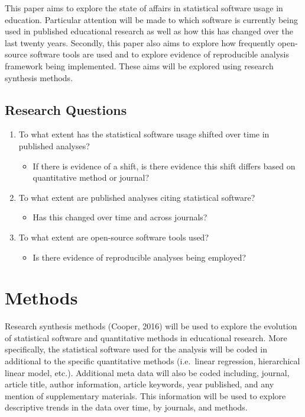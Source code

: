\documentclass[english,man]{apa6}
\providecommand{\tightlist}{%
  \setlength{\itemsep}{0pt}\setlength{\parskip}{0pt}}
\newcounter{author}
\theoremstyle{definition}
\theoremstyle{definition}
\theoremstyle{remark}
\begin{document}
This paper aims to explore the state of affairs in statistical software
usage in education. Particular attention will be made to which software
is currently being used in published educational research as well as how
this has changed over the last twenty years. Secondly, this paper also
aims to explore how frequently open-source software tools are used and
to explore evidence of reproducible analysis framework being
implemented. These aims will be explored using research synthesis
methods.

\subsection{Research Questions}\label{research-questions}

\begin{enumerate}
\def\labelenumi{\arabic{enumi}.}
\tightlist
\item
  To what extent has the statistical software usage shifted over time in
  published analyses?

  \begin{itemize}
  \tightlist
  \item
    If there is evidence of a shift, is there evidence this shift
    differs based on quantitative method or journal?
  \end{itemize}
\item
  To what extent are published analyses citing statistical software?

  \begin{itemize}
  \tightlist
  \item
    Has this changed over time and across journals?
  \end{itemize}
\item
  To what extent are open-source software tools used?

  \begin{itemize}
  \tightlist
  \item
    Is there evidence of reproducible analyses being employed?
  \end{itemize}
\end{enumerate}

\section{Methods}\label{methods}

Research synthesis methods (Cooper, 2016) will be used to explore the
evolution of statistical software and quantitative methods in
educational research. More specifically, the statistical software used
for the analysis will be coded in additional to the specific
quantitative methods (i.e.~linear regression, hierarchical linear model,
etc.). Additional meta data will also be coded including, journal,
article title, author information, article keywords, year published, and
any mention of supplementary materials. This information will be used to
explore descriptive trends in the data over time, by journals, and
methods.
\end{document}

